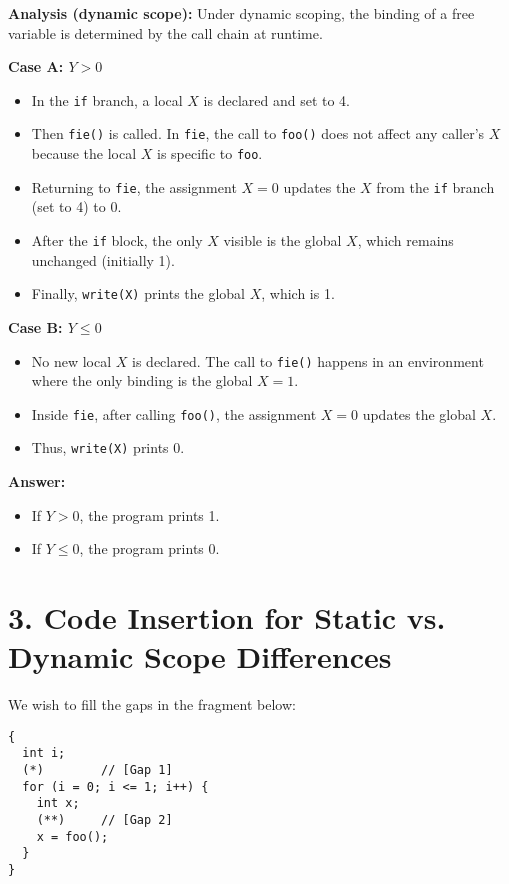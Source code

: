 \documentclass[12pt]{article}
\begin{document}
\textbf{Analysis (dynamic scope):}
Under dynamic scoping, the binding of a free variable is determined by the call chain at runtime.

\textbf{Case A: \( Y > 0 \)}
\begin{itemize}
  \item In the \texttt{if} branch, a local \( X \) is declared and set to 4.
  \item Then \texttt{fie()} is called. In \texttt{fie}, the call to \texttt{foo()} does not affect any caller’s \( X \) because the local \( X \) is specific to \texttt{foo}.
  \item Returning to \texttt{fie}, the assignment \( X = 0 \) updates the \( X \) from the \texttt{if} branch (set to 4) to 0.
  \item After the \texttt{if} block, the only \( X \) visible is the global \( X \), which remains unchanged (initially 1).
  \item Finally, \texttt{write(X)} prints the global \( X \), which is 1.
\end{itemize}

\textbf{Case B: \( Y \leq 0 \)}
\begin{itemize}
  \item No new local \( X \) is declared. The call to \texttt{fie()} happens in an environment where the only binding is the global \( X = 1 \).
  \item Inside \texttt{fie}, after calling \texttt{foo()}, the assignment \( X = 0 \) updates the global \( X \).
  \item Thus, \texttt{write(X)} prints 0.
\end{itemize}

\textbf{Answer:}
\begin{itemize}
  \item If \( Y > 0 \), the program prints 1.
  \item If \( Y \leq 0 \), the program prints 0.
\end{itemize}

\section*{3. Code Insertion for Static vs. Dynamic Scope Differences}
We wish to fill the gaps in the fragment below:

\begin{verbatim}
{ 
  int i;
  (*)        // [Gap 1]
  for (i = 0; i <= 1; i++) {
    int x;
    (**)     // [Gap 2]
    x = foo();
  }
}
\end{verbatim}
\end{document}
